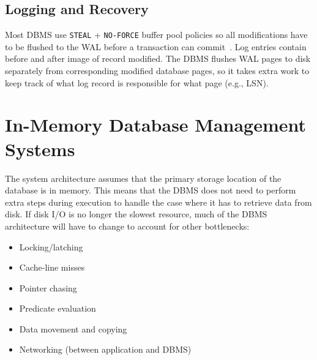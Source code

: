 \documentclass[11pt]{article}
\begin{document}

\subsection*{Logging and Recovery}
Most DBMS use \texttt{STEAL} + \texttt{NO-FORCE} buffer pool policies so all modifications 
have to be flushed to the WAL before a transaction can commit~\cite{franklin14}.
Log entries contain before and after image of record modified. The DBMS flushes WAL pages 
to disk separately from corresponding modified database pages, so it takes extra work to keep track 
of what log record is responsible for what page (e.g., LSN).


\section{In-Memory Database Management Systems}
The system architecture assumes that the primary storage location of the database is in 
memory. This means that the DBMS does not need to perform extra steps during execution to 
handle the case where it has to retrieve data from disk.
If disk I/O is no longer the slowest resource, much of the DBMS architecture will have to 
change to account for other bottlenecks:~\cite{stonebraker2007}
\begin{itemize}
    \item Locking/latching
    \item Cache-line misses
    \item Pointer chasing
    \item Predicate evaluation
    \item Data movement and copying
    \item Networking (between application and DBMS)
\end{itemize}
    
\end{document}
